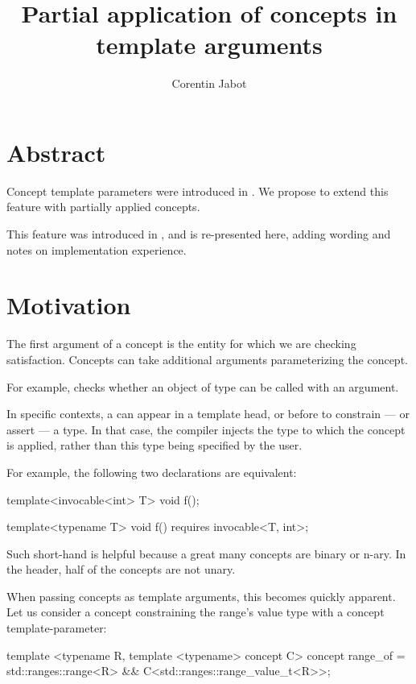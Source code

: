 \documentclass{wg21}
\title{Partial application of concepts in template arguments}
\author{Corentin Jabot}{corentin.jabot@gmail.com}
\begin{document}
\maketitle

\section{Abstract}

Concept template parameters were introduced in . We propose to extend this feature with partially applied concepts.

This feature was introduced in , and is re-presented here, adding wording and notes on implementation experience.

\section{Motivation}


The first argument of a concept is the entity for which we are checking satisfaction.
Concepts can take additional arguments parameterizing the concept.

For example,  checks whether an object of type  can be called
with an  argument.

In specific contexts, a  can appear in a template head, or before  to constrain --- or assert ---
a type. In that case, the compiler injects the type to which the concept is applied, rather than this type being specified by the user.

For example, the following two declarations are equivalent:

\begin{colorblock}
template<invocable<int> T>
void f();

template<typename T>
void f() requires invocable<T, int>;
\end{colorblock}

Such short-hand is helpful because a great many concepts are binary or n-ary. In the  header, half of the concepts are not unary.


When passing concepts as template arguments, this becomes quickly apparent.
Let us consider a  concept constraining the range's value type with a concept template-parameter:

\begin{colorblock}
template <typename R, template <typename> concept C>
concept range_of = std::ranges::range<R> && C<std::ranges::range_value_t<R>>;
\end{colorblock}
\end{document}
